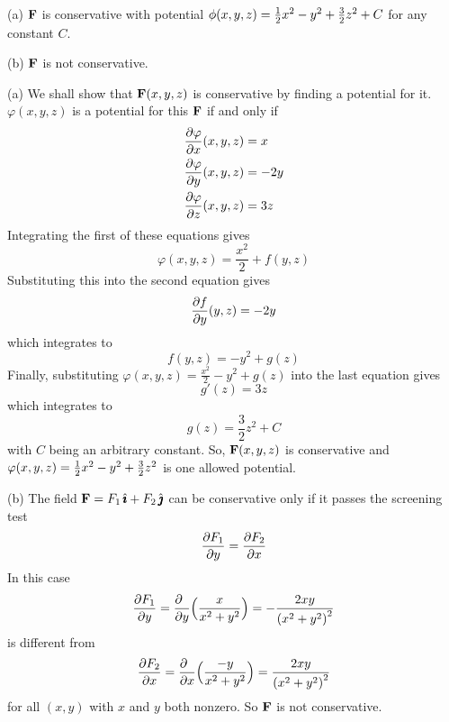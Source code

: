 \begin{answer}
(a) $\mathbf{F}$ is conservative with potential 
   $\phi(x,y,z)=\tfrac{1}{2} x^2-y^2+\frac{3}{2}z^2+C$ for any constant $C$.

(b) $\mathbf{F}$ is not conservative.
\end{answer}
\begin{solution}
(a) We shall show that $\mathbf{F}(x,y,z)$ is conservative
by finding a potential for it. $\varphi(x,y,z)$ is a potential for this $\mathbf{F}$ 
if and only if
\begin{align*}
\pdiff{\varphi}{x}(x,y,z) &= x \\
\pdiff{\varphi}{y}(x,y,z) &= -2y \\
\pdiff{\varphi}{z}(x,y,z) &= 3z
\end{align*}
Integrating the first of these equations gives
\begin{equation*}
\varphi(x,y,z) = \frac{x^2}{2} + f(y,z)
\end{equation*}
Substituting this into the second equation gives 
\begin{equation*}
\pdiff{f}{y}(y,z) 
   = -2y 
\end{equation*}
which integrates to
\begin{equation*}
f(y,z) = -y^2+ g(z)
\end{equation*}
Finally, substituting $\varphi(x,y,z) = \frac{x^2}{2} -y^2 + g(z)$
into the last equation gives
\begin{equation*}
 g'(z) = 3z
\end{equation*}
which integrates to
\begin{equation*}
g(z) = \frac{3}{2} z^2 +C
\end{equation*}
with $C$ being an arbitrary constant.
So, $\mathbf{F}(x,y,z)$ is conservative and
$\varphi(x,y,z)=\tfrac{1}{2} x^2-y^2+\frac{3}{2}z^2$ is one allowed potential.

(b) 
The field $\mathbf{F}= F_1\,\hat{\pmb{\imath}} + F_2\,\hat{\pmb{\jmath}}$ can be conservative 
only if it passes the screening test
\begin{equation*}
\pdiff{F_1}{y}=\pdiff{F_2}{x}
\end{equation*}
In this case
\begin{equation*}
\pdiff{F_1}{y}
=\frac{\partial\hfill}{\partial y}\Big(\frac{x}{x^2+y^2}\Big)
=-\frac{2xy}{{(x^2+y^2)}^2}
\end{equation*}
is different from 
\begin{equation*}
\pdiff{F_2}{x}
=\frac{\partial\hfill}{\partial x}\Big(\frac{-y}{x^2+y^2}\Big)
=\frac{2xy}{{(x^2+y^2)}^2}
\end{equation*}
for all $(x,y)$ with $x$ and $y$ both nonzero.
So $\mathbf{F}$ is not conservative.
\end{solution}



